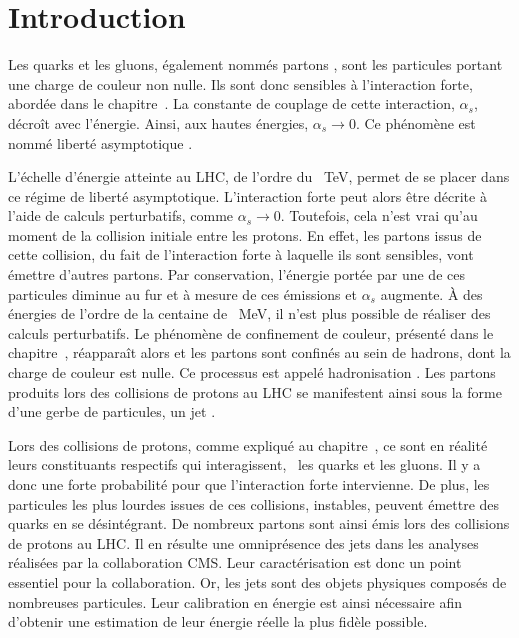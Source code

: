 \section{Introduction}\label{chapter-JERC-section-introduction}
Les quarks et les gluons, également nommés \og partons \fg, sont les particules portant une charge de couleur non nulle.
Ils sont donc sensibles à l'interaction forte, abordée dans le chapitre~.
La constante de couplage de cette interaction, $\alpha_s$, décroît avec l'énergie.
Ainsi, aux hautes énergies, $\alpha_s \to 0$.
Ce phénomène est nommé \og liberté asymptotique \fg.
\par
L'échelle d'énergie atteinte au LHC, de l'ordre du \SI{}{\TeV}, permet de se placer dans ce régime de liberté asymptotique.
L'interaction forte peut alors être décrite à l'aide de calculs perturbatifs, comme $\alpha_s \to 0$.
Toutefois, cela n'est vrai qu'au moment de la collision initiale entre les protons.
En effet, les partons issus de cette collision, du fait de l'interaction forte à laquelle ils sont sensibles, vont émettre d'autres partons.
Par conservation, l'énergie portée par une de ces particules diminue au fur et à mesure de ces émissions et $\alpha_s$ augmente.
À des énergies de l'ordre de la centaine de \SI{}{\MeV}, il n'est plus possible de réaliser des calculs perturbatifs.
Le phénomène de confinement de couleur, présenté dans le chapitre~, réapparaît alors et les partons sont confinés au sein de hadrons, dont la charge de couleur est nulle.
Ce processus est appelé \og hadronisation \fg.
Les partons produits lors des collisions de protons au LHC se manifestent ainsi sous la forme d'une gerbe de particules, un \og jet \fg.
\par
Lors des collisions de protons, comme expliqué au chapitre~,
ce sont en réalité leurs constituants respectifs qui interagissent,
\ie\ les quarks et les gluons.
Il y a donc une forte probabilité pour que l'interaction forte intervienne.
De plus, les particules les plus lourdes issues de ces collisions, instables, peuvent émettre des quarks en se désintégrant.
De nombreux partons sont ainsi émis lors des collisions de protons au LHC.
Il en résulte une omniprésence des jets dans les analyses réalisées par la collaboration CMS.
Leur caractérisation est donc un point essentiel pour la collaboration.
Or, les jets sont des objets physiques composés de nombreuses particules.
Leur calibration en énergie est ainsi nécessaire afin d'obtenir une estimation de leur énergie réelle la plus fidèle possible.
\par

